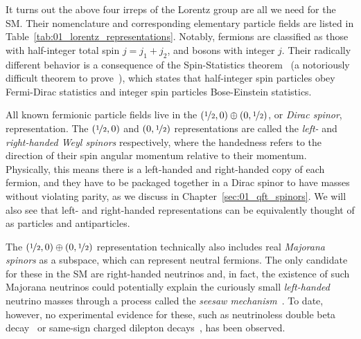 It turns out the above four irreps of the Lorentz group are all we need for the SM.
Their nomenclature and corresponding elementary particle fields are listed in Table~\ref{tab:01_lorentz_representations}.
Notably, fermions are classified as those with half-integer total spin $j = j_1 + j_2$, and bosons with integer $j$.
Their radically different behavior is a consequence of the Spin-Statistics theorem~\cite{PhysRev.110.1450} (a notoriously difficult theorem to prove~\cite{FeynmanVol3}), which states that half-integer spin particles obey Fermi-Dirac statistics and integer spin particles Bose-Einstein statistics.

All known fermionic particle fields live in the $(\cnicefrac{1}{2}, 0) \oplus (0, \cnicefrac{1}{2})$, or \textit{Dirac spinor}, representation.
The $(\cnicefrac{1}{2}, 0)$ and $(0, \cnicefrac{1}{2})$ representations are called the \textit{left-} and \textit{right-handed Weyl spinors} respectively, where the handedness refers to the direction of their spin angular momentum relative to their momentum.
Physically, this means there is a left-handed and right-handed copy of each fermion, and they have to be packaged together in a Dirac spinor to have masses without violating parity, as we discuss in Chapter~\ref{sec:01_qft_spinors}.
We will also see that left- and right-handed representations can be equivalently thought of as particles and antiparticles.

The $(\cnicefrac{1}{2}, 0) \oplus (0, \cnicefrac{1}{2})$ representation technically also includes real \textit{Majorana spinors} as a subspace, which can represent neutral fermions.
The only candidate for these in the SM are right-handed neutrinos and, in fact, the existence of such Majorana neutrinos could potentially explain the curiously small \textit{left-handed} neutrino masses through a process called the \textit{seesaw mechanism}~\cite{Foot:1988aq, Schechter:1980gr}.
To date, however, no experimental evidence for these, such as neutrinoless double beta decay~\cite{Rodejohann:2011mu} or same-sign charged dilepton decays~\cite{CMS:2018jxx}, has been observed.

